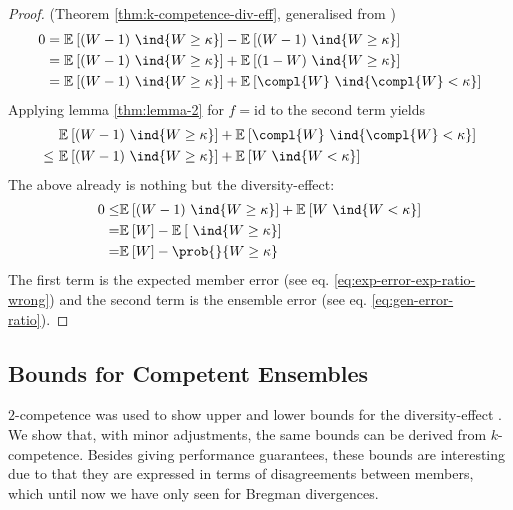 \documentclass[../main.tex]{subfiles}
\begin{document}
\begin{proof} (Theorem \ref{thm:k-competence-div-eff}, generalised from \cite{theisen})
    \begin{align*}
        0 &= \mathbb{E}_{}\left[ (W-1)~\ind{W \geq \kappa} \right]  - \mathbb{E}_{}\left[ (W-1) ~\ind{W \geq \kappa} \right]  \\
        &= \mathbb{E}_{}\left[ (W-1)~\ind{W \geq \kappa} \right]  + \mathbb{E}_{}\left[ (1-W)~\ind{W \geq \kappa} \right]  \\
        &= \mathbb{E}_{}\left[ (W-1)~\ind{W \geq \kappa} \right]  + \mathbb{E}_{}\left[  \compl{W} ~\ind{\compl{W} < \kappa} \right]   \\
    \end{align*}
    Applying lemma \ref{thm:lemma-2} for $f = \text{id}$ to the second term yields
    \begin{align*}
        & \mathbb{E}_{}\left[ (W-1)~\ind{W \geq \kappa} \right]  + \mathbb{E}_{}\left[  \compl{W} ~\ind{\compl{W} < \kappa} \right]   \\  
        \leq~ &  \mathbb{E}_{}\left[ (W-1)~\ind{W \geq \kappa} \right]  + \mathbb{E}_{}\left[ W ~\ind{W < \kappa} \right] 
    \end{align*}
    The above already is nothing but the diversity-effect:
    \begin{align*}
        0 \leq& \mathbb{E}_{}\left[ (W-1)~\ind{W \geq \kappa} \right]  + \mathbb{E}_{}\left[ W ~\ind{W < \kappa} \right]  \\
        = & \mathbb{E}_{}\left[ W  \right]  - \mathbb{E}_{}\left[ ~\ind{W \geq \kappa} \right]  \\
        = & \mathbb{E}_{}\left[ W \right]  - \prob{}{W \geq \kappa}
    \end{align*}
    The first term is the expected member error (see  eq. \ref{eq:exp-error-exp-ratio-wrong}) and the second term is the ensemble error (see eq. \ref{eq:gen-error-ratio}). 
\end{proof}

\subsection{Bounds for Competent Ensembles}

$2$-competence was used to show upper and lower bounds for the diversity-effect \cite{theisen}. We show that, with minor adjustments, the same bounds can be derived from $k$-competence. 
Besides giving performance guarantees, these bounds are interesting due to that they are expressed in terms of disagreements between members, which until now we have only seen for Bregman divergences.
\end{document}
